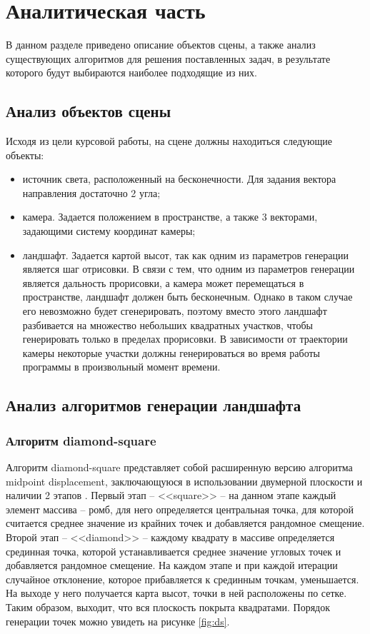 \chapter{Аналитическая часть}

В данном разделе приведено описание объектов сцены, а также анализ существующих алгоритмов для решения поставленных задач, в результате которого будут выбираются наиболее подходящие из них.

\section{Анализ объектов сцены}

Исходя из цели курсовой работы, на сцене должны находиться следующие объекты:

\begin{itemize}
	\item источник света, расположенный на бесконечности. Для задания вектора направления достаточно 2 угла;
	\item камера. Задается положением в пространстве, а также 3 векторами, задающими систему координат камеры;
	\item ландшафт. Задается картой высот, так как одним из параметров генерации является шаг отрисовки. В связи с тем, что одним из параметров генерации является дальность прорисовки, а камера может перемещаться в пространстве, ландшафт должен быть бесконечным. Однако в таком случае его невозможно будет сгенерировать, поэтому вместо этого ландшафт разбивается на множество небольших квадратных участков, чтобы генерировать только в пределах прорисовки. В зависимости от траектории камеры некоторые участки должны генерироваться во время работы программы в произвольный момент времени. 
\end{itemize}

\section{Анализ алгоритмов генерации ландшафта}

\subsection{Алгоритм diamond-square}

Алгоритм diamond-square представляет собой расширенную версию алгоритма midpoint displacement, заключающуюся в использовании двумерной плоскости и наличии 2 этапов \cite{ds}. Первый этап -- <<square>> -- на данном этапе каждый элемент массива -- ромб, для него определяется центральная точка, для которой считается среднее значение из крайних точек и добавляется рандомное смещение. Второй этап -- <<diamond>> -- каждому квадрату в массиве определяется срединная точка, которой устанавливается среднее значение угловых точек и добавляется рандомное смещение. На каждом этапе и при каждой итерации случайное отклонение, которое прибавляется к срединным точкам, уменьшается. На выходе у него получается карта высот, точки в ней расположены по сетке. Таким образом, выходит, что вся плоскость покрыта квадратами. Порядок генерации точек можно увидеть на рисунке \ref{fig:ds}. 

